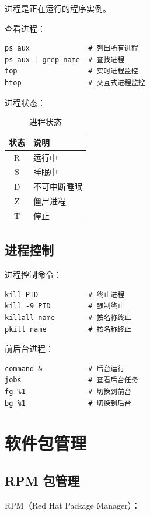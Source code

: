 \documentclass[12pt,UTF8]{ctexbook}
\begin{document}
进程是正在运行的程序实例。

查看进程：
\begin{verbatim}
ps aux              # 列出所有进程
ps aux | grep name  # 查找进程
top                 # 实时进程监控
htop                # 交互式进程监控
\end{verbatim}

进程状态：
\begin{table}[htbp]
    \centering
    \caption{进程状态}
    \begin{tabular}{|c|p{8cm}|}
        \hline
        \textbf{状态} & \textbf{说明} \\
        \hline
        R & 运行中 \\
        \hline
        S & 睡眠中 \\
        \hline
        D & 不可中断睡眠 \\
        \hline
        Z & 僵尸进程 \\
        \hline
        T & 停止 \\
        \hline
    \end{tabular}
\end{table}

\section{进程控制}
\label{sec:process_control}

进程控制命令：
\begin{verbatim}
kill PID            # 终止进程
kill -9 PID         # 强制终止
killall name        # 按名称终止
pkill name          # 按名称终止
\end{verbatim}

前后台进程：
\begin{verbatim}
command &           # 后台运行
jobs                # 查看后台任务
fg %1               # 切换到前台
bg %1               # 切换到后台
\end{verbatim}

\chapter{软件包管理}
\label{chap:package_management}

\section{RPM 包管理}
\label{sec:rpm_management}

RPM（Red Hat Package Manager）：
\end{document}
